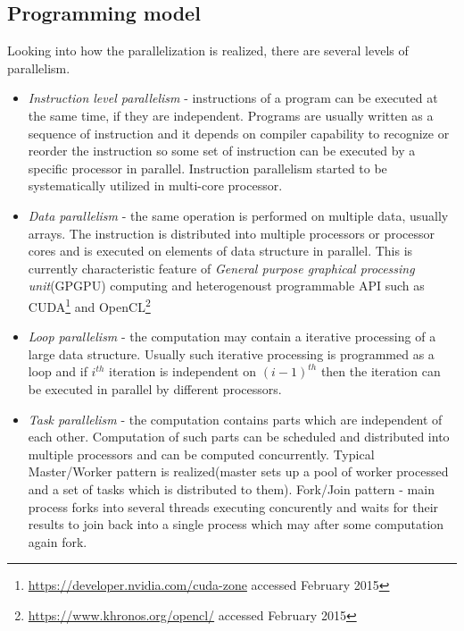 \subsection{Programming model}
\label{sec:parallelprogramming}
Looking into how the parallelization is realized, there are several levels of parallelism.
\begin{itemize}
\item{\emph{Instruction level parallelism} - instructions of a program can be executed at the same time, if they are independent. Programs are usually written as a sequence of instruction and it depends on compiler capability to recognize or reorder the instruction so some set of instruction can be executed by a specific processor in parallel. Instruction parallelism started to be systematically utilized in multi-core processor.}
\item{\emph{Data parallelism} - the same operation is performed on multiple data, usually arrays. The instruction is distributed into multiple processors or processor cores and is executed on elements of data structure in parallel. This is currently characteristic feature of \emph{General purpose graphical processing unit}(GPGPU) computing and heterogenoust programmable API such as CUDA\footnote{\url{https://developer.nvidia.com/cuda-zone} accessed February 2015} and OpenCL\footnote{\url{https://www.khronos.org/opencl/} accessed February 2015}}
\item{\emph{Loop parallelism} - the computation may contain a iterative processing of a large data structure. Usually such iterative processing is programmed as a loop and if $i^{th}$ iteration is independent on $(i-1)^{th}$ then the iteration can be executed in parallel by different processors.}
\item{\emph{Task parallelism} - the computation contains parts which are independent of each other. Computation of such parts can be scheduled and distributed into multiple processors and can be computed concurrently. Typical Master/Worker pattern is realized(master sets up a pool of worker processed and a set of tasks which is distributed to them). Fork/Join pattern - main process forks into several threads executing concurently and waits for their results to join back into a single process which may after some computation again fork.}
\end{itemize}

